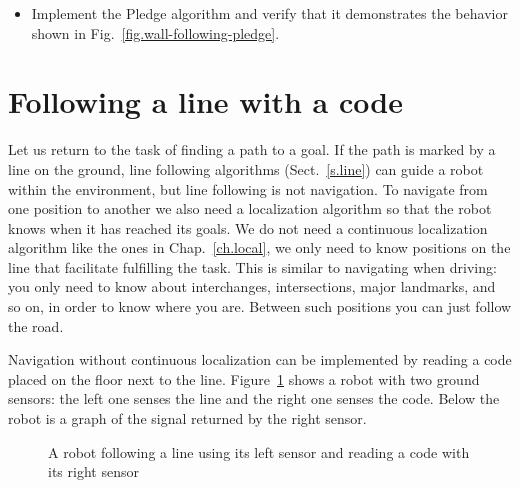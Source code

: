 \begin{framed}
\begin{itemize}
\item Implement the Pledge algorithm and verify that it demonstrates the behavior shown in Fig.~\ref{fig.wall-following-pledge}.
\end{itemize}
\end{framed}

\section{Following a line with a code}\label{s.no-localization}

Let us return to the task of finding a path to a goal. If the path is marked by a line on the ground, line following algorithms (Sect.~\ref{s.line}) can guide a robot within the environment, but line following is not navigation. To navigate from one position to another we also need a localization algorithm so that the robot knows when it has reached its goals. We do not need a continuous localization algorithm like the ones in Chap.~\ref{ch.local}, we only need to know positions on the line that facilitate fulfilling the task. This is similar to navigating when driving: you only need to know about interchanges, intersections, major landmarks, and so on, in order to know where you are. Between such positions you can just follow the road.

Navigation without continuous localization can be implemented by reading a code placed on the floor next to the line. Figure~\ref{fig.code-line} shows a robot with two ground sensors: the left one senses the line and the right one senses the code. Below the robot is a graph of the signal returned by the right sensor.

\begin{figure}
\begin{center}
\end{center}
\caption{A robot following a line using its left sensor and reading a code with its right sensor}\label{fig.code-line}
\end{figure}

